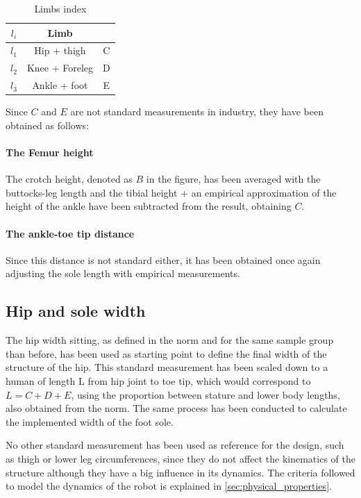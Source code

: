 \begin{table}
\begin{center}
	\begin{tabular}{c | c | c}
	  $l_{i}$ & Limb \\
	  \hline
	  $l_{1}$ & Hip + thigh & C \\
	  $l_{2}$ & Knee + Foreleg & D\\
	  $l_{3}$ & Ankle + foot & E 
	\end{tabular}
	\caption{Limbs index}
	\label{tab:limb_index}
\end{center}
\end{table}

Since $C$ and $E$ are not standard measurements in industry, they have been obtained as follows:

\paragraph{The Femur height}
The crotch height, denoted as $B$ in the figure, has been averaged with the buttocks-leg length and the tibial height + an empirical approximation of the height of the ankle have been subtracted from the result, obtaining $C$.

\paragraph{The ankle-toe tip distance}
Since this distance is not standard either, it has been obtained once again adjusting the sole length with empirical measurements.

\subsection{Hip and sole width} %
\label{sub:subsection_name}
The hip width sitting, as defined in the norm and for the same sample group than before, has been used as starting point to define the final width of the structure of the hip. 
This standard measurement has been scaled down to a human of length L from hip joint to toe tip, which would correspond to $L=C+D+E$, using the proportion between stature and lower body lengths, also obtained from the norm.
The same process has been conducted to calculate the implemented width of the foot sole.


No other standard measurement has been used as reference for the design, such as thigh or lower leg circumferences, since they do not affect the kinematics of the structure although they have a big influence in its dynamics.
The criteria followed to model the dynamics of the robot is explained in \ref{sec:physical_properties}.




